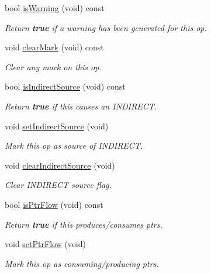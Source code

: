 \begin{DoxyCompactItemize}
bool \mbox{\hyperlink{class_pcode_op_a4b75c2511aca4f50dbb2a61036adb772}{is\+Warning}} (void) const
\begin{DoxyCompactList}\small\item\em Return {\bfseries{true}} if a warning has been generated for this op. \end{DoxyCompactList}\item 
void \mbox{\hyperlink{class_pcode_op_af901dbb8a9dc99db2abab8d3c8ccde2e}{clear\+Mark}} (void) const
\begin{DoxyCompactList}\small\item\em Clear any mark on this op. \end{DoxyCompactList}\item 
bool \mbox{\hyperlink{class_pcode_op_a88294a4264d5f44a011e204fa3f4ae75}{is\+Indirect\+Source}} (void) const
\begin{DoxyCompactList}\small\item\em Return {\bfseries{true}} if this causes an I\+N\+D\+I\+R\+E\+CT. \end{DoxyCompactList}\item 
void \mbox{\hyperlink{class_pcode_op_a475b7a2511390c89d795e839baf69305}{set\+Indirect\+Source}} (void)
\begin{DoxyCompactList}\small\item\em Mark this op as source of I\+N\+D\+I\+R\+E\+CT. \end{DoxyCompactList}\item 
void \mbox{\hyperlink{class_pcode_op_a6525e43210caa2bb68bb6e3a5bb5037c}{clear\+Indirect\+Source}} (void)
\begin{DoxyCompactList}\small\item\em Clear I\+N\+D\+I\+R\+E\+CT source flag. \end{DoxyCompactList}\item 
bool \mbox{\hyperlink{class_pcode_op_ab3039f0ed1b520774755aa97dc015cac}{is\+Ptr\+Flow}} (void) const
\begin{DoxyCompactList}\small\item\em Return {\bfseries{true}} if this produces/consumes ptrs. \end{DoxyCompactList}\item 
void \mbox{\hyperlink{class_pcode_op_aad11df3624f33a1d6ffa2e8a82f3868b}{set\+Ptr\+Flow}} (void)
\begin{DoxyCompactList}\small\item\em Mark this op as consuming/producing ptrs. \end{DoxyCompactList}\item 

\end{DoxyCompactItemize}
